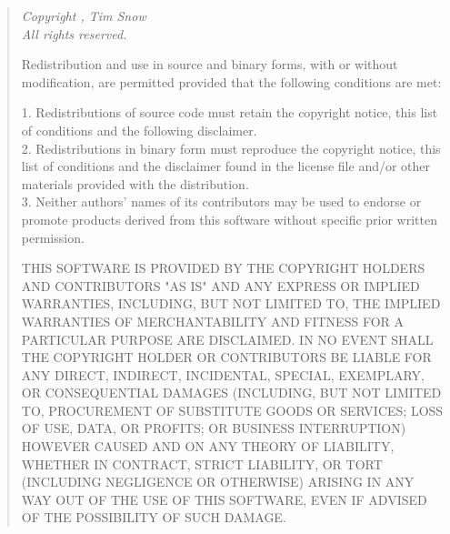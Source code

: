 \documentclass[a4paper]{article}
\begin{document}
			\begin{quote}
				{\it 
					Copyright , Tim Snow\\
					All rights reserved.

					Redistribution and use in source and binary forms, with or without modification, are permitted provided that the following conditions are met:

					1. Redistributions of source code must retain the copyright notice, this list of conditions and the following disclaimer.\\
					2. Redistributions in binary form must reproduce the copyright notice, this list of conditions and the disclaimer found in the license file and/or other materials provided with the distribution.\\
					3. Neither authors' names of its contributors may be used to endorse or promote products derived from this software without specific prior written permission.

					THIS SOFTWARE IS PROVIDED BY THE COPYRIGHT HOLDERS AND CONTRIBUTORS "AS IS" AND ANY EXPRESS OR IMPLIED WARRANTIES, INCLUDING, BUT NOT LIMITED TO, THE IMPLIED WARRANTIES OF MERCHANTABILITY AND FITNESS FOR A PARTICULAR PURPOSE ARE DISCLAIMED. IN NO EVENT SHALL THE COPYRIGHT HOLDER OR CONTRIBUTORS BE LIABLE FOR ANY DIRECT, INDIRECT, INCIDENTAL, SPECIAL, EXEMPLARY, OR CONSEQUENTIAL DAMAGES (INCLUDING, BUT NOT LIMITED TO, PROCUREMENT OF SUBSTITUTE GOODS OR SERVICES; LOSS OF USE, DATA, OR PROFITS; OR BUSINESS INTERRUPTION) HOWEVER CAUSED AND ON ANY THEORY OF LIABILITY, WHETHER IN CONTRACT, STRICT LIABILITY, OR TORT (INCLUDING NEGLIGENCE OR OTHERWISE) ARISING IN ANY WAY OUT OF THE USE OF THIS SOFTWARE, EVEN IF ADVISED OF THE POSSIBILITY OF SUCH DAMAGE.
				}
			\end{quote}
\end{document}
